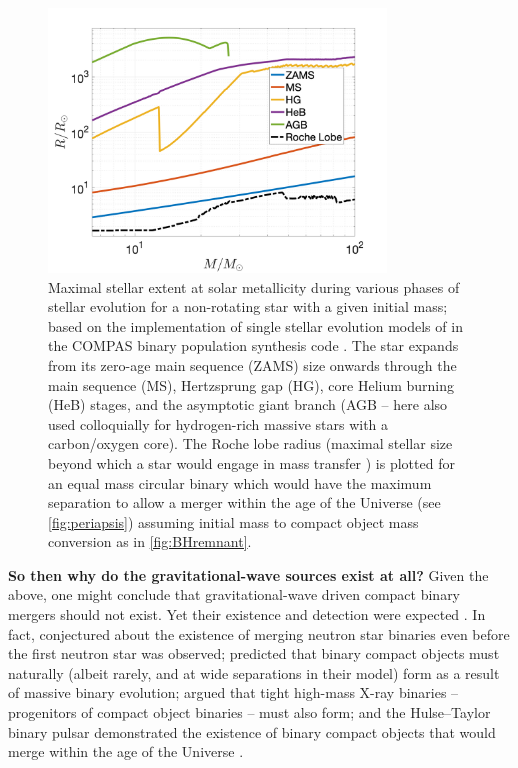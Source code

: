 \documentclass[review]{elsarticle}
\begin{document}
\begin{figure}
	\centering	
	\includegraphics[width=0.8\textwidth]{StellarRadiusZsolarRoche.png}
\caption{Maximal stellar extent at solar metallicity during various phases of stellar evolution for a non-rotating star with a given initial mass; based on the implementation of single stellar evolution models of \citet{Hurley:2000} in the COMPAS binary population synthesis code \citep{COMPAS:2021}.   The star expands from its zero-age main sequence (ZAMS) size onwards through the main sequence (MS), Hertzsprung gap (HG), core Helium burning (HeB) stages, and the asymptotic giant branch (AGB -- here also used colloquially for hydrogen-rich massive stars with a carbon/oxygen core).  The Roche lobe radius (maximal stellar size beyond which a star would engage in mass transfer \citep{Eggleton:1983}) is plotted for an equal mass circular binary which would have the maximum separation to allow a merger within the age of the Universe (see \autoref{fig:periapsis}) assuming initial mass to compact object mass conversion as in \autoref{fig:BHremnant}.\label{fig:Rmax} }
\end{figure}

\textbf{So then why do the gravitational-wave sources exist at all?} Given the above, one might conclude that gravitational-wave driven compact binary mergers should not exist. Yet their existence and detection were expected \citep{ratesdoc}. In fact, \citet{Dyson:1962} conjectured about the existence of merging neutron star binaries even before the first neutron star was observed; \citet{Tutukov:1973} predicted that binary compact objects must naturally (albeit rarely, and at wide separations in their model) form as a result of massive binary evolution; \citet{vdHDeLoore:1973} argued that tight high-mass X-ray binaries -- progenitors of compact object binaries -- must also form; and the Hulse--Taylor binary pulsar \citep{HulseTaylor:1975} demonstrated the existence of binary compact objects that would merge within the age of the Universe \citep[for early explanations of its formation in the context of binary evolution, see][]{FlanneryvdH:1975,DeLoore:1975}.
\end{document}
